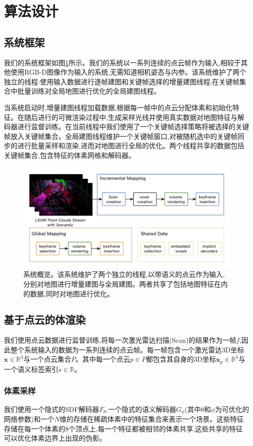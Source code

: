\section{算法设计}\label{algorithm}
\subsection{系统框架}
我们的系统框架如图\ref{system}所示。我们的系统以一系列连续的点云帧作为输入,相较于其他使用RGB-D图像作为输入的系统,无需知道相机姿态与内参。该系统维护了两个独立的线程:使用输入数据进行逐帧建图和关键帧选择的增量建图线程;在关键帧集合中批量训练对全局地图进行优化的全局建图线程。

当系统启动时,增量建图线程加载数据,根据每一帧中的点云分配体素和初始化特征。在随后进行的可微渲染过程中,生成采样光线并使用真实数据对地图特征与解码器进行监督训练。在当前线程中我们使用了一个关键帧选择策略将被选择的关键帧放入关键帧集合。全局建图线程维护一个关键帧窗口,对被随机选中的关键帧同步的进行批量采样和渲染,进而对地图进行全局的优化。两个线程共享的数据包括关键帧集合,包含特征的体素网格和解码器。
\begin{figure}[htbp]
    \includegraphics[scale = 0.355]{figures/system.jpg}
    \centering
    \caption{系统概览。该系统维护了两个独立的线程,以带语义的点云作为输入,分别对地图进行增量建图与全局建图。两者共享了包括地图特征在内的数据,同时对地图进行优化。}\label{system}
\end{figure}
\subsection{基于点云的体渲染}
我们使用点云数据进行监督训练,将每一次激光雷达扫描(Scan)的结果作为一帧$f$,因此整个系统输入的数据为一系列连续的点云帧。每一帧包含一个激光雷达3D坐标$\mathbf{x}\in \mathbb{R}^3 $与一个点云集合$P$。其中每一个点云$p\in P$都包含其自身的3D坐标$\mathbf{x}_p\in \mathbb{R}^3$与一个语义标签索引$s\in \mathbb{R}$。
\subsubsection{体素采样}
我们使用一个隐式的SDF解码器$F_\theta$,一个隐式的语义解码器$G_\phi$(其中$\theta$和$\phi$为可优化的网络参数)和一个$N$维的存储在稀疏体素中的特征集合来表示一个场景。这些特征存储在每一个体素的8个顶点上,每一个特征都被相邻的体素共享,这些共享的特征可以优化体素边界上出现的伪影。

